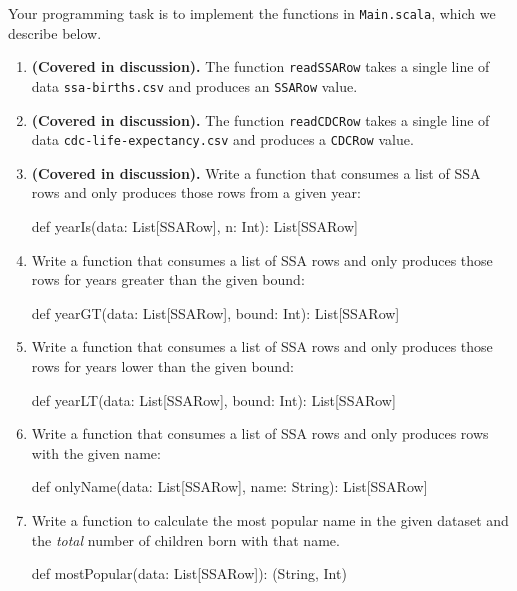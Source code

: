 \documentclass[9pt]{extbook}
\begin{document}
Your programming task is to implement the functions in \texttt{Main.scala},
which we describe below.

\begin{enumerate}

  \item \textbf{(Covered in discussion).} The function \lstinline|readSSARow| takes a single line of data 
  \texttt{ssa-births.csv} and produces an \lstinline|SSARow| value.

  \item  \textbf{(Covered in discussion).} The function \lstinline|readCDCRow| takes a single line of data 
  \texttt{cdc-life-expectancy.csv} and produces a \lstinline|CDCRow| value.

  \item  \textbf{(Covered in discussion).} Write a function that consumes a list of SSA rows and only produces
  those rows from a given year:
  \begin{scalacode}
  def yearIs(data: List[SSARow], n: Int): List[SSARow]
  \end{scalacode}

  \item Write a function that consumes a list of SSA rows and only produces
  those rows for years greater than the given bound:
  \begin{scalacode}
  def yearGT(data: List[SSARow], bound: Int): List[SSARow]
  \end{scalacode}

  \item Write a function that consumes a list of SSA rows and only produces
  those rows for years lower than the given bound:
  \begin{scalacode}
  def yearLT(data: List[SSARow], bound: Int): List[SSARow]
  \end{scalacode}

  \item Write a function that consumes a list of SSA rows and only produces
  rows with the given name:
  \begin{scalacode}
  def onlyName(data: List[SSARow], name: String): List[SSARow]
  \end{scalacode}

  \item Write a function to calculate the most popular name in the given dataset
  and the \emph{total} number of children born with that name.

  \begin{scalacode}
  def mostPopular(data: List[SSARow]): (String, Int)
  \end{scalacode}


\end{enumerate}
\end{document}
